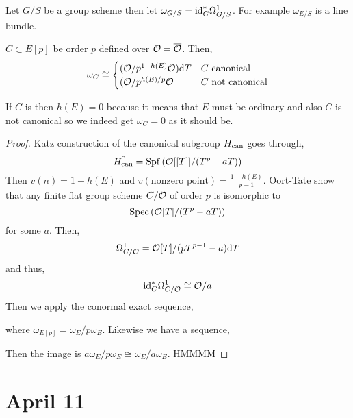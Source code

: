 \documentclass[12pt]{article}
\begin{document}
Let $G / S$ be a group scheme then let $\omega_{G/S} = \mathrm{id}_G^* \Omega^1_{G/S}$. For example $\omega_{E/S}$ is a line bundle. 

\begin{prop}
$C \subset E[p]$ be order $p$ defined over $\mathcal{O} = \overline{\mathcal{O}}$. Then,
\[ \omega_C \cong 
\begin{cases}
(\mathcal{O} / p^{1- h(E)} \mathcal{O}) \mathrm{d}{T} & C \text{ canonical }
\\
(\mathcal{O} / p^{h(E) / p} \mathcal{O} & C \text{ not canonical} 
\end{cases}\] 
\end{prop}

\begin{rmk}
If $C$ is \etale then $h(E) = 0$ because it means that $E$ must be ordinary and also $C$ is not canonical so we indeed get $\omega_C = 0$ as it should be. 
\end{rmk}

\begin{proof}
Katz construction of the canonical subgroup $H_{\mathrm{can}}$ goes through,
\[ \hat{H_{\mathrm{can}}} = \mathrm{Spf}\left( \mathcal{O}[[T]] / (T^p - a T) \right) \]
Then $v(n) = 1 - h(E)$ and $v(\text{nonzero point}) = \frac{1 - h(E)}{p-1}$. Oort-Tate show that any finite flat group scheme $C / \mathcal{O}$ of order $p$ is isomorphic to
\[ \mathrm{Spec}\left( \mathcal{O}[T] / (T^p - a T) \right) \]
for some $a$. Then,
\[ \Omega^1_{C/\mathcal{O}} = \mathcal{O}[T] / (p T^{p-1} - a) \mathrm{d}{T} \]
and thus,
\[ \mathrm{id}^*_C \Omega^1_{C/\mathcal{O}} \cong \mathcal{O} / a \]
Then we apply the conormal exact sequence,
\begin{center}
\end{center}
where $\omega_{E[p]} = \omega_E / p \omega_E$. Likewise we have a sequence,
\begin{center}
\end{center}
Then the image is $a \omega_E / p \omega_E \cong \omega_E / a \omega_E$. HMMMM 
\end{proof}

\section{April 11}
\end{document}
